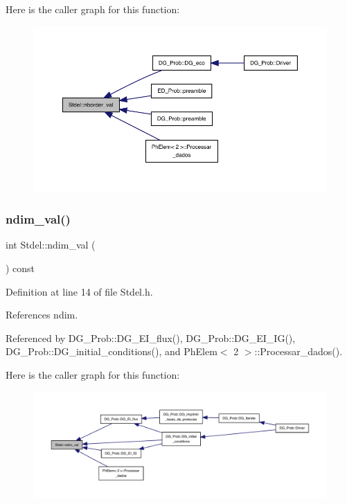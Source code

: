 Here is the caller graph for this function\+:
\nopagebreak
\begin{figure}[H]
\begin{center}
\leavevmode
\includegraphics[width=350pt]{classStdel_aac8e97661e46c48fafa91f13caa03a9f_icgraph}
\end{center}
\end{figure}
\mbox{\label{classStdel_a383df930bee8dc298d7d412b3b632ebb}} 
\subsubsection{\texorpdfstring{ndim\+\_\+val()}{ndim\_val()}}
{\footnotesize\ttfamily int Stdel\+::ndim\+\_\+val (\begin{DoxyParamCaption}{ }\end{DoxyParamCaption}) const\hspace{0.3cm}{\ttfamily [inline]}}



Definition at line 14 of file Stdel.\+h.



References ndim.



Referenced by D\+G\+\_\+\+Prob\+::\+D\+G\+\_\+\+E\+I\+\_\+flux(), D\+G\+\_\+\+Prob\+::\+D\+G\+\_\+\+E\+I\+\_\+\+I\+G(), D\+G\+\_\+\+Prob\+::\+D\+G\+\_\+initial\+\_\+conditions(), and Ph\+Elem$<$ 2 $>$\+::\+Processar\+\_\+dados().

Here is the caller graph for this function\+:
\nopagebreak
\begin{figure}[H]
\begin{center}
\leavevmode
\includegraphics[width=350pt]{classStdel_a383df930bee8dc298d7d412b3b632ebb_icgraph}
\end{center}
\end{figure}
\mbox{\label{classStdel_aa45f211663f5e8e47fdea32232ff23ea}} 
